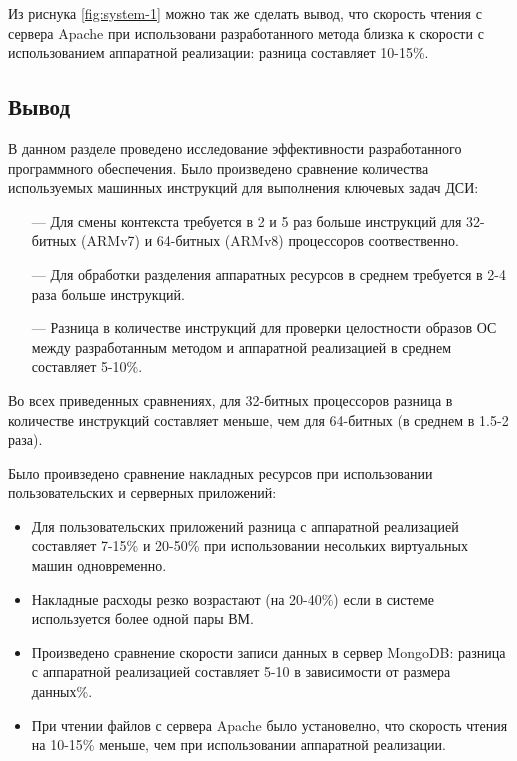 Из риснука \ref{fig:system-1} можно так же сделать вывод, что скорость чтения с сервера Apache при использовани разработанного метода близка к скорости с использованием аппаратной реализации: разница составляет 10-15\%.

\subsection*{Вывод}

В данном разделе проведено исследование эффективности разработанного программного обеспечения. Было произведено сравнение количества используемых машинных инструкций для выполнения ключевых задач ДСИ: 

\begin{itemize}
	\item [---] Для смены контекста требуется в 2 и 5 раз больше инструкций для 32-битных (ARMv7) и 64-битных (ARMv8) процессоров соотвественно.
	\item [---] Для обработки разделения аппаратных ресурсов в среднем требуется в 2-4 раза больше инструкций.
	\item [---] Разница в количестве инструкций для проверки целостности образов ОС между разработанным методом и аппаратной реализацией в среднем составляет 5-10\%.
\end{itemize}

Во всех приведенных сравнениях, для 32-битных процессоров разница в количестве инструкций составляет меньше, чем для 64-битных (в среднем в 1.5-2 раза). 

Было проивзедено сравнение накладных ресурсов при использовании пользовательских и серверных приложений:

\begin{itemize}
	\item Для пользовательских приложений разница с аппаратной реализацией составляет 7-15\% и 20-50\% при использовании несольких виртуальных машин одновременно.
	\item Накладные расходы резко возрастают (на 20-40\%) если в системе используется более одной пары ВМ.
	\item Произведено сравнение скорости записи данных в сервер MongoDB: разница с аппаратной реализацией составляет 5-10 в зависимости от размера данных\%.
	\item При чтении файлов с сервера Apache было установелно, что скорость чтения на 10-15\% меньше, чем при использовании аппаратной реализации.
\end{itemize}

\pagebreak
